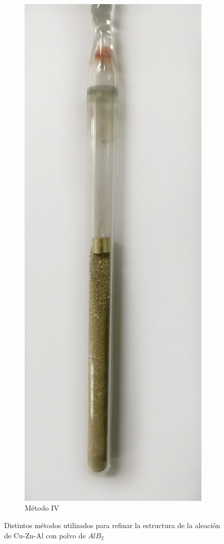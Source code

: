 \documentclass[a4paper,12pt,fleqn,twoside,openany]{book}
\begin{document}
\begin{figure}[h]
\begin{subfigure}{0.1\textwidth}
        \includegraphics[width=\textwidth]{Img/Procedimiento/ClavoPolvo.jpg}
        \caption{Método IV}
        \label{fig:ClavoPolvo}
    \end{subfigure}
 \caption{Distintos métodos utilizados para refinar la estructura de la aleación de Cu-Zn-Al con polvo de $AlB_2$} 
    \end{figure}
\end{document}
